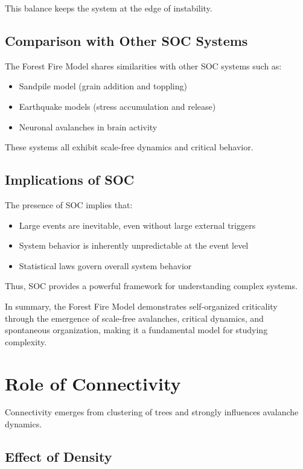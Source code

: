 \documentclass[12pt,a4paper]{article}
\begin{document}
This balance keeps the system at the edge of instability.

\subsection{Comparison with Other SOC Systems}

The Forest Fire Model shares similarities with other SOC systems such as:

\begin{itemize}
\item Sandpile model (grain addition and toppling)
\item Earthquake models (stress accumulation and release)
\item Neuronal avalanches in brain activity
\end{itemize}

These systems all exhibit scale-free dynamics and critical behavior.

\subsection{Implications of SOC}

The presence of SOC implies that:

\begin{itemize}
\item Large events are inevitable, even without large external triggers
\item System behavior is inherently unpredictable at the event level
\item Statistical laws govern overall system behavior
\end{itemize}

Thus, SOC provides a powerful framework for understanding complex systems.

\bigskip

In summary, the Forest Fire Model demonstrates self-organized criticality through the emergence of scale-free avalanches, critical dynamics, and spontaneous organization, making it a fundamental model for studying complexity.
\section{Role of Connectivity}

Connectivity emerges from clustering of trees and strongly influences avalanche dynamics.

\subsection{Effect of Density}
\end{document}

